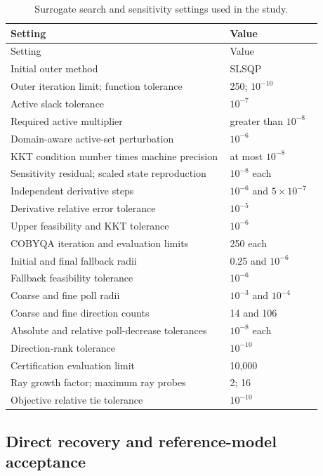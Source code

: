 \documentclass[a4paper,fleqn]{cas-sc}
\begin{document}
\begin{longtable}{p{0.62\linewidth}p{0.26\linewidth}}
\caption{Surrogate search and sensitivity settings used in the study.}\label{tab:Ssearch}\\
\toprule
Setting & Value\\
\midrule
\endfirsthead
\toprule
Setting & Value\\
\midrule
\endhead
Initial outer method & SLSQP\\
Outer iteration limit; function tolerance & 250; $10^{-10}$\\
Active slack tolerance & $10^{-7}$\\
Required active multiplier & greater than $10^{-8}$\\
Domain-aware active-set perturbation & $10^{-6}$\\
KKT condition number times machine precision & at most $10^{-8}$\\
Sensitivity residual; scaled state reproduction & $10^{-8}$ each\\
Independent derivative steps & $10^{-6}$ and $5\times10^{-7}$\\
Derivative relative error tolerance & $10^{-5}$\\
Upper feasibility and KKT tolerance & $10^{-6}$\\
COBYQA iteration and evaluation limits & 250 each\\
Initial and final fallback radii & 0.25 and $10^{-6}$\\
Fallback feasibility tolerance & $10^{-6}$\\
Coarse and fine poll radii & $10^{-3}$ and $10^{-4}$\\
Coarse and fine direction counts & 14 and 106\\
Absolute and relative poll-decrease tolerances & $10^{-8}$ each\\
Direction-rank tolerance & $10^{-10}$\\
Certification evaluation limit & 10,000\\
Ray growth factor; maximum ray probes & 2; 16\\
Objective relative tie tolerance & $10^{-10}$\\
\bottomrule
\end{longtable}

\subsection{Direct recovery and reference-model acceptance}
\label{sec:Sevaluation}
\end{document}
